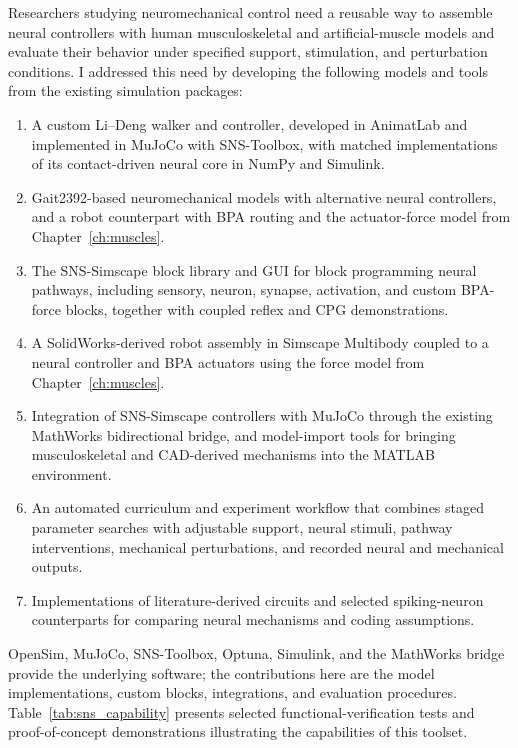 Researchers studying neuromechanical control need a reusable way to assemble neural controllers with human musculoskeletal and artificial-muscle models and evaluate their behavior under specified support, stimulation, and perturbation conditions. I addressed this need by developing the following models and tools from the existing simulation packages:
\begin{enumerate}
    \item A custom Li--Deng walker and controller, developed in AnimatLab and implemented in MuJoCo with SNS-Toolbox, with matched implementations of its contact-driven neural core in NumPy and Simulink.
    \item Gait2392-based neuromechanical models with alternative neural controllers, and a robot counterpart with BPA routing and the actuator-force model from Chapter~\ref{ch:muscles}.
    \item The SNS-Simscape block library and GUI for block programming neural pathways, including sensory, neuron, synapse, activation, and custom BPA-force blocks, together with coupled reflex and CPG demonstrations.
    \item A SolidWorks-derived robot assembly in Simscape Multibody coupled to a neural controller and BPA actuators using the force model from Chapter~\ref{ch:muscles}.
    \item Integration of SNS-Simscape controllers with MuJoCo through the existing MathWorks bidirectional bridge, and model-import tools for bringing musculoskeletal and CAD-derived mechanisms into the MATLAB environment.
    \item An automated curriculum and experiment workflow that combines staged parameter searches with adjustable support, neural stimuli, pathway interventions, mechanical perturbations, and recorded neural and mechanical outputs.
    \item Implementations of literature-derived circuits and selected spiking-neuron counterparts for comparing neural mechanisms and coding assumptions.
\end{enumerate}
OpenSim, MuJoCo, SNS-Toolbox, Optuna, Simulink, and the MathWorks bridge provide the underlying software; the contributions here are the model implementations, custom blocks, integrations, and evaluation procedures. Table~\ref{tab:sns_capability} presents selected functional-verification tests and proof-of-concept demonstrations illustrating the capabilities of this toolset.
